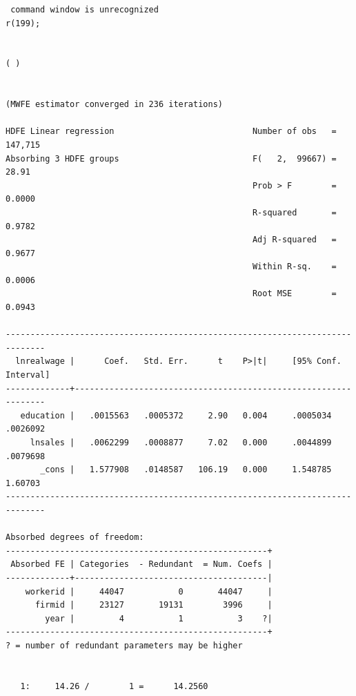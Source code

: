 \documentclass[
  12pt,
]{article}
\newenvironment{Shaded}{\begin{snugshade}}{\end{snugshade}}
\newcommand{\KeywordTok}[1]{\textcolor[rgb]{0.13,0.29,0.53}{\textbf{#1}}}
\newcommand{\NormalTok}[1]{#1}
\newcommand{\OperatorTok}[1]{\textcolor[rgb]{0.81,0.36,0.00}{\textbf{#1}}}
\newcommand{\StringTok}[1]{\textcolor[rgb]{0.31,0.60,0.02}{#1}}
\begin{document}
\begin{verbatim}
 command window is unrecognized
r(199);


( )


(MWFE estimator converged in 236 iterations)

HDFE Linear regression                            Number of obs   =    147,715
Absorbing 3 HDFE groups                           F(   2,  99667) =      28.91
                                                  Prob > F        =     0.0000
                                                  R-squared       =     0.9782
                                                  Adj R-squared   =     0.9677
                                                  Within R-sq.    =     0.0006
                                                  Root MSE        =     0.0943

------------------------------------------------------------------------------
  lnrealwage |      Coef.   Std. Err.      t    P>|t|     [95% Conf. Interval]
-------------+----------------------------------------------------------------
   education |   .0015563   .0005372     2.90   0.004     .0005034    .0026092
     lnsales |   .0062299   .0008877     7.02   0.000     .0044899    .0079698
       _cons |   1.577908   .0148587   106.19   0.000     1.548785     1.60703
------------------------------------------------------------------------------

Absorbed degrees of freedom:
-----------------------------------------------------+
 Absorbed FE | Categories  - Redundant  = Num. Coefs |
-------------+---------------------------------------|
    workerid |     44047           0       44047     |
      firmid |     23127       19131        3996     |
        year |         4           1           3    ?|
-----------------------------------------------------+
? = number of redundant parameters may be higher


   1:     14.26 /        1 =      14.2560
\end{verbatim}

\begin{Shaded}
\end{Shaded}
\end{document}
